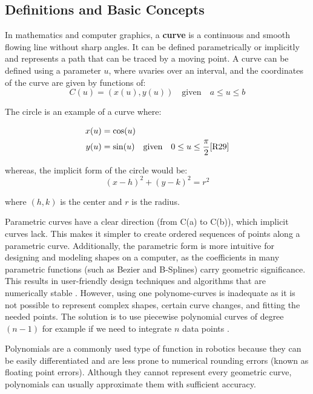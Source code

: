 \subsection{Definitions and Basic Concepts}

In mathematics and computer graphics, a \textbf{curve} is a continuous and smooth flowing line without sharp angles. 
It can be defined parametrically or implicitly and represents a path that can be traced by a moving point.
A curve can be defined using a parameter 
\(u\), where \(u\)varies over an interval, and the coordinates of the curve are given by functions of:
\begin{equation}
    C(u) = (x(u), y(u)) \quad \text{given} \quad a \leq u \leq b \label{eq:curve}
\end{equation}

The circle is an example of a curve where:

\hspace*{-1cm} %
\begin{align}
    x(u) &= \cos(u) \\
    y(u) &= \sin(u) \quad \text{given} \quad 0 \leq u \leq \frac{\pi}{2}     \cite{R29}
\end{align}

whereas, the implicit form of the circle would be:
\begin{equation}
    (x - h)^2 + (y - k)^2 = r^2
\end{equation}

where \((h,k)\) is the center and \(r\) is the radius.


Parametric curves have a clear direction (from C(a) to C(b)), which implicit curves lack. This makes 
it simpler to create ordered sequences of points along a parametric curve. Additionally, the parametric 
form is more intuitive for designing and modeling shapes on a computer, as the coefficients in many 
parametric functions (such as Bezier and B-Splines) carry geometric significance. This results in 
user-friendly design techniques and algorithms that are numerically stable \cite{R28}. 
However, using one polynome-curves is inadequate as it is not possible to represent complex shapes, certain 
curve changes, and fitting the needed points. 
The solution is to use piecewise polynomial curves of degree \((n-1)\) for example if we need to integrate
\(n\) data points \cite{R29}.

Polynomials are a commonly used type of function in robotics because they can be easily differentiated 
and are less prone to numerical rounding errors (known as floating point errors). Although they cannot 
represent every geometric curve, polynomials can usually approximate them with sufficient accuracy.

